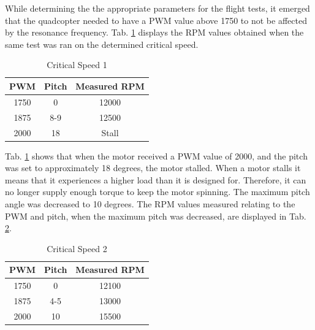 While determining the the appropriate parameters for the flight tests, it emerged that the quadcopter needed to have a PWM value above 1750 to not be affected by the resonance frequency. Tab. \ref{tab:rpm2} displays the RPM values obtained when the same test was ran on the determined critical speed.

\begin{table}[H]
\caption{Critical Speed 1}
\label{tab:rpm2}
\centering
\begin{tabular}{| c | c | c |} 
  \hline
 PWM & Pitch & Measured RPM\\
 \hline
 1750 & 0 & 12000 \\
 1875 & 8-9 & 12500 \\
 2000 & 18 & Stall \\
 \hline
\end{tabular}
\end{table}\bigskip

Tab. \ref{tab:rpm2} shows that when the motor received a PWM value of 2000, and the pitch was set to approximately 18 degrees, the motor stalled. When a motor stalls it means that it experiences a higher load than it is designed for. Therefore, it can no longer supply enough torque to keep the motor spinning. The maximum pitch angle was decreased to 10 degrees. The RPM values measured relating to the PWM and pitch, when the maximum pitch was decreased, are displayed in Tab. \ref{tab:rpm3}.

\begin{table}[H]
\caption{Critical Speed 2}
\label{tab:rpm3}
\centering
\begin{tabular}{| c | c | c |} 
  \hline
 PWM & Pitch & Measured RPM\\
 \hline
 1750 & 0 & 12100 \\
 1875 & 4-5 & 13000 \\
 2000 & 10 & 15500 \\
 \hline
\end{tabular}
\end{table}\bigskip

